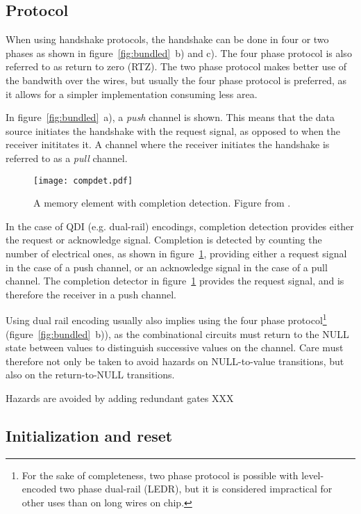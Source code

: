 \subsection{Protocol}

When using handshake protocols, the handshake can be done in four or
two phases as shown in figure~\ref{fig:bundled}~b) and c). The four
phase protocol is also referred to as return to zero (RTZ). The two
phase protocol makes better use of the bandwith over the wires, but
usually the four phase protocol is preferred, as it allows for a
simpler implementation consuming less area.

In figure~\ref{fig:bundled}~a), a \emph{push} channel is shown. This
means that the data source initiates the handshake with the request
signal, as opposed to when the receiver inititates it. A channel where
the receiver initiates the handshake is referred to as a \emph{pull}
channel.

\begin{figure}[htbp]
  \centering
  \texttt{[image: compdet.pdf]}
  \caption{A memory element with completion detection. Figure from
    \cite[pp. 21]{sparso}.}
  \label{fig:compdet}
\end{figure}

In the case of QDI (e.g. dual-rail) encodings, completion detection
provides either the request or acknowledge signal. Completion is
detected by counting the number of electrical ones, as shown in
figure~\ref{fig:compdet}, providing either a request signal in the
case of a push channel, or an acknowledge signal in the case of a pull
channel. The completion detector in figure~\ref{fig:compdet} provides
the request signal, and is therefore the receiver in a push channel.

Using dual rail encoding usually also implies using the four phase
protocol\footnote{For the sake of completeness, two phase protocol is
  possible with level-encoded two phase dual-rail (LEDR)\cite{ledr},
  but it is considered impractical for other uses than on long wires
  on chip.}  (figure~\ref{fig:bundled}~b)), as the combinational
circuits must return to the NULL state between values to distinguish
successive values on the channel. Care must therefore not only be
taken to avoid hazards on NULL-to-value transitions, but also on the
return-to-NULL transitions.

Hazards are avoided by adding redundant gates XXX

\subsection{Initialization and reset}

